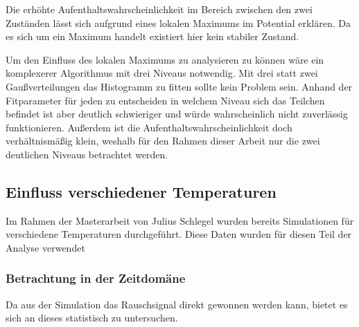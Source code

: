 \documentclass[main.tex]{subfiles}
\begin{document}
Die erhöhte Aufenthaltswahrscheinlichkeit im Bereich zwischen den zwei Zuständen lässt sich aufgrund eines lokalen Maximums im Potential erklären. Da es sich um ein Maximum handelt existiert hier kein stabiler Zustand.

Um den Einfluss des lokalen Maximums zu analysieren zu können wäre ein komplexerer Algorithmus mit drei Niveaus notwendig. Mit drei statt zwei Gaußverteilungen das Histogramm zu fitten sollte kein Problem sein. Anhand der Fitparameter für jeden zu entscheiden in welchem Niveau sich das Teilchen befindet ist aber deutlich schwieriger und würde wahrscheinlich nicht zuverlässig funktionieren.
Außerdem ist die Aufenthaltswahrscheinlichkeit doch verhältnismäßig klein, weshalb für den Rahmen dieser Arbeit nur die zwei deutlichen Niveaus betrachtet werden.

\subsection{Einfluss verschiedener Temperaturen}


Im Rahmen der Masterarbeit von Julius Schlegel \cite{schlegel-master} wurden bereits Simulationen für verschiedene Temperaturen durchgeführt. Diese Daten wurden für diesen Teil der Analyse verwendet

\subsubsection{Betrachtung in der Zeitdomäne}

Da aus der Simulation das Rauschsignal direkt gewonnen werden kann, bietet es sich an dieses statistisch zu untersuchen.
\end{document}
